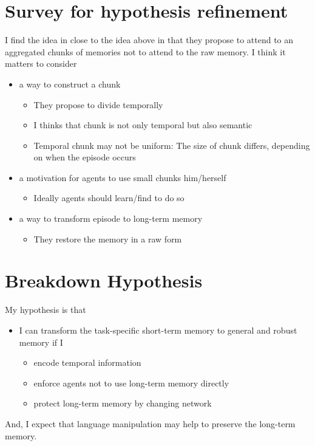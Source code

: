 \documentclass[12pt]{article}
\begin{document}
\section{Survey for hypothesis refinement}
I find the idea in \cite{Lampinen21} close to the idea above in that they propose to attend to an aggregated 
chunks of memories not to attend to the raw memory. I think it matters to consider
\begin{itemize}
    \item a way to construct a chunk
    \begin{itemize}
        \item They propose to divide temporally
        \item I thinks that chunk is not only temporal but also semantic
        \item Temporal chunk may not be uniform: The size of chunk differs,
        depending on when the episode occurs
    \end{itemize}
    \item a motivation for agents to use small chunks him/herself
    \begin{itemize}
        \item Ideally agents should learn/find to do so
    \end{itemize}
    \item a way to transform episode to long-term memory
    \begin{itemize}
        \item They restore the memory in a raw form
    \end{itemize}    
\end{itemize}

\section{Breakdown Hypothesis}
My hypothesis is that
\begin{itemize}
    \item I can transform the task-specific short-term memory to general and robust memory if I
    \begin{itemize}
        \item encode temporal information
        \item enforce agents not to use long-term memory directly
        \item protect long-term memory by changing network
    \end{itemize}
\end{itemize}
And, I expect that language manipulation may help to preserve the long-term memory.
\end{document}
